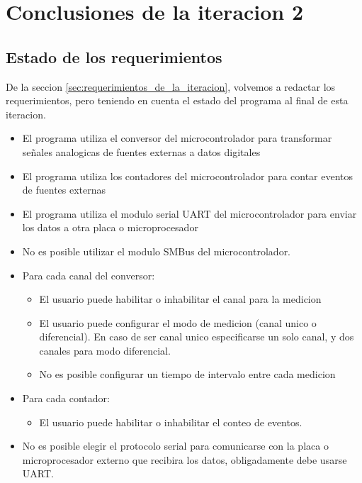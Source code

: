 \section{Conclusiones de la iteracion 2} %
\label{sec:conclusiones_de_la_iteracion_2}


\subsection{Estado de los requerimientos} %
\label{sub:estado_de_los_requerimientos}


De la seccion \ref{sec:requerimientos_de_la_iteracion}, volvemos a redactar los requerimientos, pero teniendo en cuenta el estado del programa al final de esta iteracion.

\begin{itemize}
\item El programa utiliza el conversor del microcontrolador para transformar señales analogicas de fuentes externas a datos digitales
\item El programa utiliza los contadores del microcontrolador para contar eventos de fuentes externas
\item El programa utiliza el modulo serial UART del microcontrolador para enviar los datos a otra placa o microprocesador
\item No es posible utilizar el modulo SMBus del microcontrolador.
\item Para cada canal del conversor:
\begin{itemize}
\item El usuario puede habilitar o inhabilitar el canal para la medicion
\item El usuario puede configurar el modo de medicion (canal unico o diferencial). En caso de ser canal unico especificarse un solo canal, y dos canales para modo diferencial.
\item No es posible configurar un tiempo de intervalo entre cada medicion
\end{itemize}
\item Para cada contador:
\begin{itemize}
\item El usuario puede habilitar o inhabilitar el conteo de eventos.
\end{itemize}
\item No es posible elegir el protocolo serial para comunicarse con la placa o microprocesador externo que recibira los datos, obligadamente debe usarse UART.

\end{itemize}

